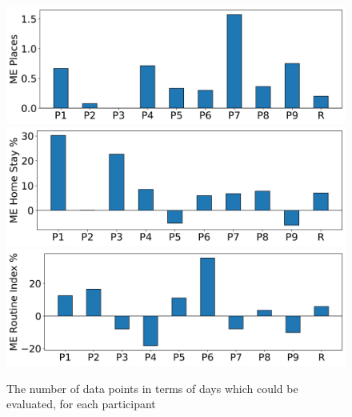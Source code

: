 \begin{figure}
    \centering
    \includegraphics[width=\textwidth]{images/study/me_places.png}
    \includegraphics[width=\textwidth]{images/study/me_homestay.png}
    \includegraphics[width=\textwidth]{images/study/me_routine.png}
    \caption{The number of data points in terms of days which could be evaluated, for each participant}
    \label{fig:plot-mean-error}
\end{figure}


